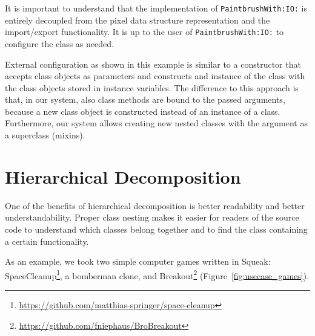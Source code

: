 It is important to understand that the implementation of \texttt{PaintbrushWith:IO:} is entirely decoupled from the pixel data structure representation and the import/export functionality. It is up to the user of \texttt{PaintbrushWith:IO:} to configure the class as needed.

External configuration as shown in this example is similar to a constructor that accepts class objects as parameters and constructs and instance of the class with the class objects stored in instance variables. The difference to this approach is that, in our system, also class methods are bound to the passed arguments, because a new class object is constructed instead of an instance of a class. Furthermore, our system allows creating new nested classes with the argument as a superclass (mixins).

\section{Hierarchical Decomposition}
\label{sec:usecase_hierach_decomp}
One of the benefits of hierarchical decomposition is better readability and better understandability. Proper class nesting makes it easier for readers of the source code to understand which classes belong together and to find the class containing a certain functionality.

As an example, we took two simple computer games written in Squeak: SpaceCleanup\footnote{\url{https://github.com/matthias-springer/space-cleanup}}, a bomberman clone, and Breakout\footnote{\url{https://github.com/fniephaus/BroBreakout}} (Figure~\ref{fig:usecase_games}).

